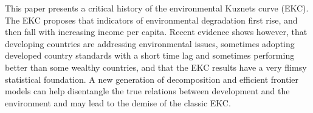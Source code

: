 This paper presents a critical history of the environmental Kuznets curve (EKC). The EKC proposes that indicators of environmental degradation first rise, and then fall with increasing income per capita. Recent evidence shows however, that developing countries are addressing environmental issues, sometimes adopting developed country standards with a short time lag and sometimes performing better than some wealthy countries, and that the EKC results have a very flimsy statistical foundation. A new generation of decomposition and efficient frontier models can help disentangle the true relations between development and the environment and may lead to the demise of the classic EKC.
